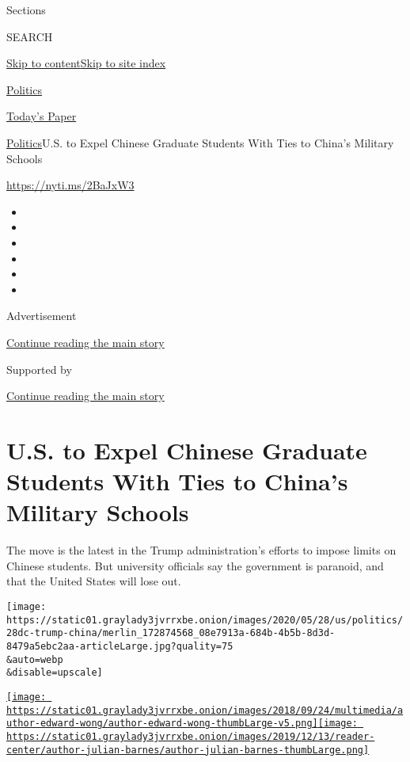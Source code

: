 Sections

SEARCH

\protect\hyperlink{site-content}{Skip to
content}\protect\hyperlink{site-index}{Skip to site index}

\href{https://www.nytimes3xbfgragh.onion/section/politics}{Politics}

\href{https://myaccount.nytimes3xbfgragh.onion/auth/login?response_type=cookie\&client_id=vi}{}

\href{https://www.nytimes3xbfgragh.onion/section/todayspaper}{Today's
Paper}

\href{/section/politics}{Politics}\textbar{}U.S. to Expel Chinese
Graduate Students With Ties to China's Military Schools

\href{https://nyti.ms/2BaJxW3}{https://nyti.ms/2BaJxW3}

\begin{itemize}
\item
\item
\item
\item
\item
\item
\end{itemize}

Advertisement

\protect\hyperlink{after-top}{Continue reading the main story}

Supported by

\protect\hyperlink{after-sponsor}{Continue reading the main story}

\hypertarget{us-to-expel-chinese-graduate-students-with-ties-to-chinas-military-schools}{%
\section{U.S. to Expel Chinese Graduate Students With Ties to China's
Military
Schools}\label{us-to-expel-chinese-graduate-students-with-ties-to-chinas-military-schools}}

The move is the latest in the Trump administration's efforts to impose
limits on Chinese students. But university officials say the government
is paranoid, and that the United States will lose out.

\texttt{[image: https://static01.graylady3jvrrxbe.onion/images/2020/05/28/us/politics/28dc-trump-china/merlin\_172874568\_08e7913a-684b-4b5b-8d3d-8479a5ebc2aa-articleLarge.jpg?quality=75\\\&auto=webp\\\&disable=upscale]}

\href{https://www.nytimes3xbfgragh.onion/by/edward-wong}{\texttt{[image: https://static01.graylady3jvrrxbe.onion/images/2018/09/24/multimedia/author-edward-wong/author-edward-wong-thumbLarge-v5.png]}}\href{https://www.nytimes3xbfgragh.onion/by/julian-e-barnes}{\texttt{[image: https://static01.graylady3jvrrxbe.onion/images/2019/12/13/reader-center/author-julian-barnes/author-julian-barnes-thumbLarge.png]}}

